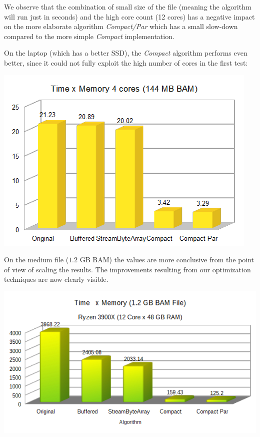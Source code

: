 \documentclass[a4paper,twoside]{article}
\begin{document}
{We observe that the combination of small size of the file (meaning the algorithm will run just in seconds) and the high core count (12 cores) has a negative impact on the more elaborate algorithm \textit{Compact/Par} which has a small slow-down compared to the more simple \textit{Compact} implementation.

On the laptop (which has a better SSD), the {\textit{Compact} } algorithm performs even better, since it could not fully exploit the high number of cores in the first test:

\begin{center}
	\includegraphics[scale=0.5]{images/times_and_memory_chart_small_144mb_intel.png}
\end{center}


On the medium file ($1.2$ GB BAM) the values are more conclusive from the point of view of scaling the results. The improvements resulting from our optimization techniques are now clearly visible.

\begin{center}
	\includegraphics[scale=0.5]{images/times_and_memory_chart.png}
\end{center}

}
\end{document}
